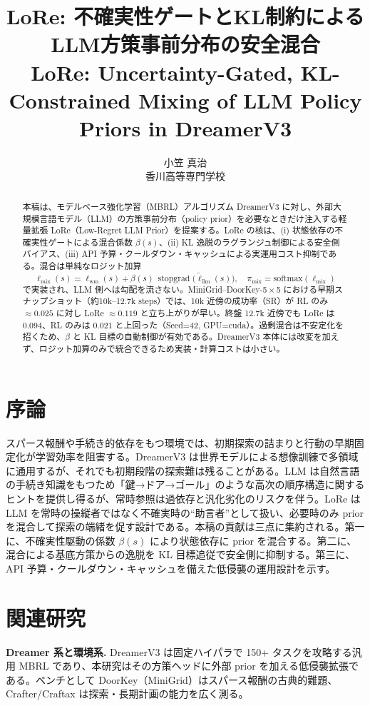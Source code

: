 \documentclass[a4paper,12pt]{article}
\title{LoRe: 不確実性ゲートとKL制約によるLLM方策事前分布の安全混合 \\ \normalsize LoRe: Uncertainty-Gated, KL-Constrained Mixing of LLM Policy Priors in DreamerV3}
\author{小笠 真治\\香川高等専門学校}
\date{}
\DeclareMathOperator{\stopgrad}{stopgrad}
\begin{document}
\maketitle

\begin{abstract}
本稿は、モデルベース強化学習（MBRL）アルゴリズム DreamerV3 に対し、外部大規模言語モデル（LLM）の方策事前分布（policy prior）を必要なときだけ注入する軽量拡張 LoRe（Low-Regret LLM Prior）を提案する。LoRe の核は、(i) 状態依存の不確実性ゲートによる混合係数 $\beta(s)$、(ii) KL 逸脱のラグランジュ制御による安全側バイアス、(iii) API 予算・クールダウン・キャッシュによる実運用コスト抑制である。混合は単純なロジット加算
\begin{equation}\label{eq:mix}
\ell_{\mathrm{mix}}(s)=\ell_{\mathrm{wm}}(s)+\beta(s)\,\stopgrad\!\bigl(\tilde{\ell}_{\mathrm{llm}}(s)\bigr),\quad 
\pi_{\mathrm{mix}}=\mathrm{softmax}(\ell_{\mathrm{mix}})
\end{equation}
で実装され、LLM 側へは勾配を流さない。MiniGrid--DoorKey-5\,$\times$\,5 における早期スナップショット（約10k--12.7k steps）では、10k 近傍の成功率（SR）が RL のみ $\approx 0.025$ に対し LoRe $\approx 0.119$ と立ち上がりが早い。終盤 12.7k 近傍でも LoRe は $0.094$、RL のみは $0.021$ と上回った（Seed=42, GPU=cuda）。過剰混合は不安定化を招くため、$\beta$ と KL 目標の自動制御が有効である。DreamerV3 本体には改変を加えず、ロジット加算のみで統合できるため実装・計算コストは小さい\citep{hafner2023dreamerv3,minigrid_doorkey}。
\end{abstract}

\section{序論}
スパース報酬や手続き的依存をもつ環境では、初期探索の詰まりと行動の早期固定化が学習効率を阻害する。DreamerV3 は世界モデルによる想像訓練で多領域に通用するが、それでも初期段階の探索難は残ることがある。LLM は自然言語の手続き知識をもつため「鍵→ドア→ゴール」のような高次の順序構造に関するヒントを提供し得るが、常時参照は過依存と汎化劣化のリスクを伴う。LoRe は LLM を常時の操縦者ではなく不確実時の“助言者”として扱い、必要時のみ prior を混合して探索の端緒を促す設計である\citep{hafner2023dreamerv3,minigrid_doorkey}。本稿の貢献は三点に集約される。第一に、不確実性駆動の係数 $\beta(s)$ により状態依存に prior を混合する。第二に、混合による基底方策からの逸脱を KL 目標追従で安全側に抑制する。第三に、API 予算・クールダウン・キャッシュを備えた低侵襲の運用設計を示す。

\section{関連研究}
\textbf{Dreamer 系と環境系.} DreamerV3 は固定ハイパラで 150+ タスクを攻略する汎用 MBRL であり、本研究はその方策ヘッドに外部 prior を加える低侵襲拡張である。ベンチとして DoorKey（MiniGrid）はスパース報酬の古典的難題、Crafter/Craftax は探索・長期計画の能力を広く測る\citep{hafner2021crafter,matthews2024craftax}。
\end{document}
